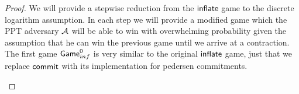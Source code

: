 \begin{proof}\label{prf:atom:infl-resistance}
    We will provide a stepwise reduction from the $\mathsf{inflate}$ game to the discrete logarithm assumption.
    In each step we will provide a modified game which the PPT adversary $\mathcal{A}$ will be able to win with overwhelming probability given the assumption that he can win the previous game until we arrive at a contraction.
    The first game $\mathsf{Game}_{inf}^{0}$ is very similar to the original $\mathsf{inflate}$ game, just that we replace $\mathsf{commit}$ with its implementation for pedersen commitments.

    \begin{center}
    \end{center}


\end{proof}
